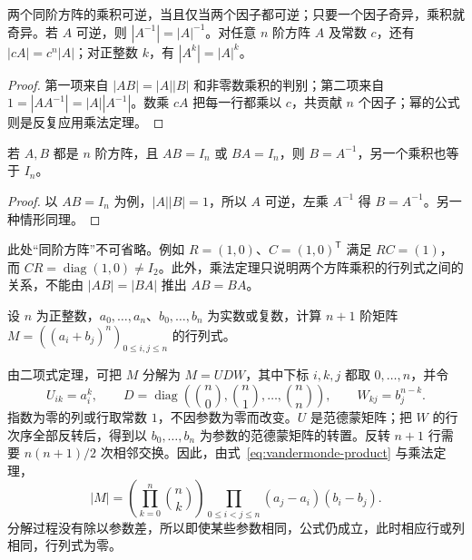 \begin{corollary}
\label{cor:matrix-determinant-consequences}
两个同阶方阵的乘积可逆，当且仅当两个因子都可逆；只要一个因子奇异，乘积就奇异。若 $A$ 可逆，则 $|A^{-1}|=|A|^{-1}$。对任意 $n$ 阶方阵 $A$ 及常数 $c$，还有 $|cA|=c^n|A|$；对正整数 $k$，有 $|A^k|=|A|^k$。
\end{corollary}

\begin{proof}
第一项来自 $|AB|=|A||B|$ 和非零数乘积的判别；第二项来自 $1=|AA^{-1}|=|A||A^{-1}|$。数乘 $cA$ 把每一行都乘以 $c$，共贡献 $n$ 个因子；幂的公式则是反复应用乘法定理。
\end{proof}

\begin{corollary}[同阶方阵的单侧逆]
\label{cor:matrix-one-sided-inverse}
若 $A,B$ 都是 $n$ 阶方阵，且 $AB=I_n$ 或 $BA=I_n$，则 $B=A^{-1}$，另一个乘积也等于 $I_n$。
\end{corollary}

\begin{proof}
以 $AB=I_n$ 为例，$|A||B|=1$，所以 $A$ 可逆，左乘 $A^{-1}$ 得 $B=A^{-1}$。另一种情形同理。
\end{proof}

此处“同阶方阵”不可省略。例如 $R=(1,0)$、$C=(1,0)^{\mathsf T}$ 满足 $RC=(1)$，而 $CR=\operatorname{diag}(1,0)\ne I_2$。此外，乘法定理只说明两个方阵乘积的行列式之间的关系，不能由 $|AB|=|BA|$ 推出 $AB=BA$。

\begin{example}
\label{ex:matrix-binomial-determinant}
设 $n$ 为正整数，$a_0,\ldots,a_n$、$b_0,\ldots,b_n$ 为实数或复数，计算 $n+1$ 阶矩阵 $M=((a_i+b_j)^n)_{0\leq i,j\leq n}$ 的行列式。
\end{example}

\begin{solve}
由二项式定理，可把 $M$ 分解为 $M=UDW$，其中下标 $i,k,j$ 都取 $0,\ldots,n$，并令
\[
    U_{ik}=a_i^k,\qquad
    D=\operatorname{diag}\left(\binom n0,\binom n1,\ldots,\binom nn\right),\qquad
    W_{kj}=b_j^{n-k}.
\]
指数为零的列或行取常数 $1$，不因参数为零而改变。$U$ 是范德蒙矩阵；把 $W$ 的行次序全部反转后，得到以 $b_0,\ldots,b_n$ 为参数的范德蒙矩阵的转置。反转 $n+1$ 行需要 $n(n+1)/2$ 次相邻交换。因此，由式~\eqref{eq:vandermonde-product} 与乘法定理，
\[
    |M|=\left(\prod_{k=0}^{n}\binom nk\right)
        \prod_{0\leq i<j\leq n}(a_j-a_i)(b_i-b_j).
\]
分解过程没有除以参数差，所以即使某些参数相同，公式仍成立，此时相应行或列相同，行列式为零。
\end{solve}

